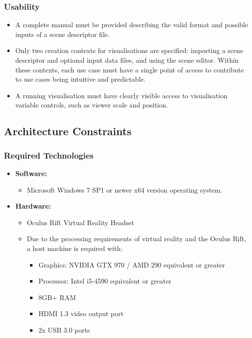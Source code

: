 \documentclass[a4paper,12pt]{article}
\begin{document}
	\subsubsection{Usability}
	
		\begin{itemize}
			\item  A complete manual must be provided describing the valid format and possible inputs of a scene descriptor file.
			\item Only two creation contexts for visualisations are specified: importing a scene descriptor and optional input data files, and using the scene editor. Within these contexts, each use case must have a single point of access to contribute to use cases being intuitive and predictable.
			\item A running visualisation must have clearly visible access to visualisation variable controls, such as viewer scale and position. 
		\end{itemize}

\newpage

\subsection{Architecture Constraints}

	\subsubsection{Required Technologies}
		
		\begin{itemize}
			\item \textbf{Software:}
				\begin{itemize}
					\item Microsoft Windows 7 SP1 or newer x64 version operating system.
				\end{itemize}
			\item \textbf{Hardware:}
				\begin{itemize}
					\item Oculus Rift Virtual Reality Headset
					\item Due to the processing requirements of virtual reality and the Oculus Rift, a host machine is required with:
						\begin{itemize}
							\item Graphics: NVIDIA GTX 970 / AMD 290 equivalent or greater
							\item Processor: Intel i5-4590 equivalent or greater
							\item 8GB+ RAM
							\item HDMI 1.3 video output port
							\item 2x USB 3.0 ports
						\end{itemize}
				\end{itemize}
		\end{itemize}
	
\end{document}
